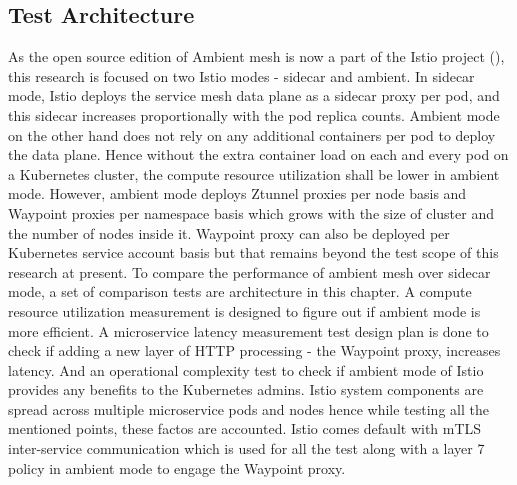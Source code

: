 \subsection{Test Architecture}
As the open source edition of Ambient mesh is now a part of the Istio project (\cite{istioHoward2022}), this research is focused on two Istio modes - sidecar and ambient. In sidecar mode, Istio deploys the service mesh data plane as a sidecar proxy per pod, and this sidecar increases proportionally with the pod replica counts. Ambient mode on the other hand does not rely on any additional containers per pod to deploy the data plane. Hence without the extra container load on each and every pod on a Kubernetes cluster, the compute resource utilization shall be lower in ambient mode. However, ambient mode deploys Ztunnel proxies per node basis and Waypoint proxies per namespace basis which grows with the size of cluster and the number of nodes inside it. Waypoint proxy can also be deployed per Kubernetes service account basis but that remains beyond the test scope of this research at present. To compare the performance of ambient mesh over sidecar mode, a set of comparison tests are architecture in this chapter. A compute resource utilization measurement is designed to figure out if ambient mode is more efficient. A microservice latency measurement test design plan is done to check if adding a new layer of HTTP processing - the Waypoint  proxy, increases latency. And an operational complexity test to check if ambient mode of Istio provides any benefits to the Kubernetes admins. Istio system components are spread across multiple microservice pods and nodes hence while testing all the mentioned points, these factos are accounted. Istio comes default with mTLS inter-service communication which is used for all the test along with a layer 7 policy in ambient mode to engage the Waypoint proxy.

